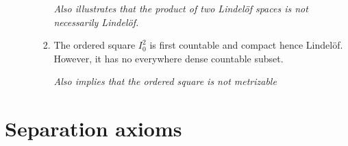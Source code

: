 \documentclass[letterpaper, 12pt]{book}
\begin{document}
\begin{enumerate}[resume]
\begin{enumerate}
\begin{enumerate}
                \textit{Also illustrates that the product of two Lindel\"of spaces is not necessarily Lindel\"of.}

            \item The ordered square $I_0^2$ is first countable and compact hence Lindel\"of. However, it has no everywhere dense countable subset.

                \textit{Also implies that the ordered square is not metrizable}
            \end{enumerate}
    \end{enumerate}
    \end{enumerate}

\section{Separation axioms}
\end{document}
